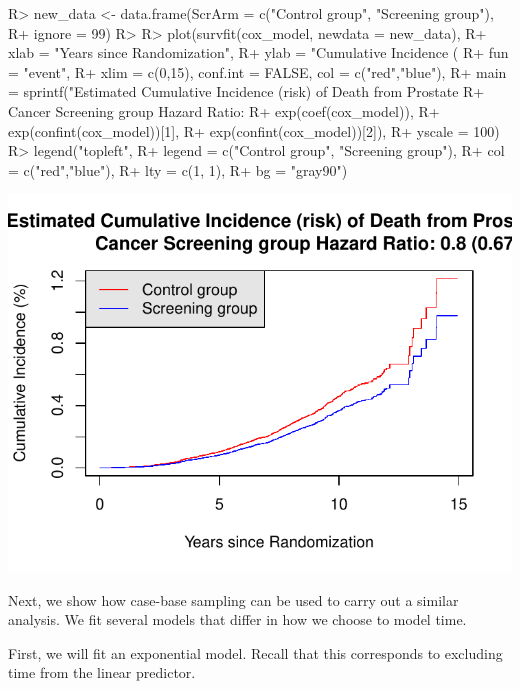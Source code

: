 \documentclass[
]{jss}
\begin{document}
\begin{CodeChunk}

\begin{CodeInput}
R> new_data <- data.frame(ScrArm = c("Control group", "Screening group"),
R+                        ignore = 99)
R> 
R> plot(survfit(cox_model, newdata = new_data),
R+      xlab = "Years since Randomization", 
R+      ylab = "Cumulative Incidence (%
R+      fun = "event",
R+      xlim = c(0,15), conf.int = FALSE, col = c("red","blue"), 
R+      main = sprintf("Estimated Cumulative Incidence (risk) of Death from Prostate 
R+                     Cancer Screening group Hazard Ratio: %
R+                     exp(coef(cox_model)), 
R+                     exp(confint(cox_model))[1], 
R+                     exp(confint(cox_model))[2]), 
R+      yscale = 100)
R> legend("topleft", 
R+        legend = c("Control group", "Screening group"), 
R+        col = c("red","blue"),
R+        lty = c(1, 1), 
R+        bg = "gray90")
\end{CodeInput}


\begin{center}\includegraphics{../figures/erspc-cox-cif-1} \end{center}

\end{CodeChunk}

Next, we show how case-base sampling can be used to carry out a similar
analysis. We fit several models that differ in how we choose to model
time.

First, we will fit an exponential model. Recall that this corresponds to
excluding time from the linear predictor.
\end{document}
